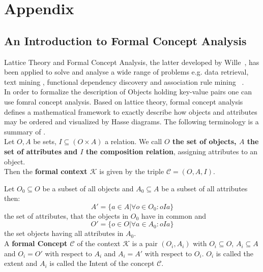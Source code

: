 \chapter{Appendix}

\section{An Introduction to Formal Concept Analysis}\label{\positionnumber}
Lattice Theory and Formal Concept Analysis, the latter developed by Wille~\cite{wille1982restructuring}, has been applied to solve and analyse a wide range of problems e.g. data retrieval, text mining , functional dependency discovery and association rule mining ~\cite{poelmans2012text, soergel1967mathematical, spoerri1993infocrystal, godin1993experimental, godin1993building, carpineto2004exploiting, carpineto2003mining, ganascia1987charade, oosthuizen1988induction, xie2002concept}. \\
In order to formalize the description of Objects holding key-value pairs one can use fomral concept analysis. Based on lattice theory, formal concept analysis defines a mathematical framework to exactly describe how objects and attributes may be ordered and visualized by Hasse diagrams. The following terminology is a summary of \cite{ganter2012formal}. \\

Let $O, A$ be sets, $I \subseteq (O \times A)$ a relation. We call \textbf{$O$ the set of objects, $A$ the set of attributes and $I$ the composition relation}, assigning attributes to an object. \\

Then the \textbf{formal context $\mathcal{K}$} is given by the triple $\mathcal{C} = (O, A, I)$. 

Let $O_0 \subseteq O$ be a subset of all objects and $A_0 \subseteq A$ be a subset of all attributes then:
\[ A' = \{ a \in A | \forall o \in O_0: oIa \}  \]
the set of attributes, that the objects in $O_0$ have in common and 
\[ O' = \{ o \in O | \forall a \in A_0: oIa \} \]
the set objects having all attributes in $A_0$. \\

A \textbf{formal Concept $\mathcal{C}$} of the context $\mathcal{K}$ is a pair $(O_i, A_i)$ with $O_i \subseteq O$,  $A_i \subseteq A$ and $O_i = O'$ with respect to $A_i$ and $A_i = A'$ with respect to $O_i$. $O_i$ is called the extent and $A_i$ is called the Intent of the concept $\mathcal{C}$. \\

